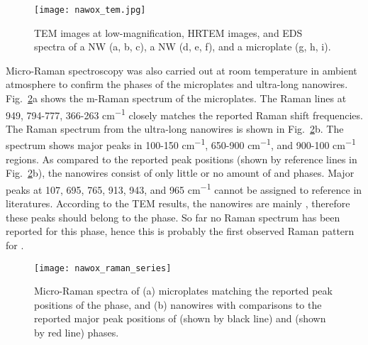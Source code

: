 \begin{figure}[htb]
\centering
\texttt{[image: nawox\_tem.jpg]}
\caption[SEM images of morphology evolution]{TEM images at low-magnification, HRTEM images, and EDS spectra of a  NW (a, b, c), a  NW (d, e, f), and a  microplate (g, h, i). }
\label{fig:nawoxtem}
\end{figure}

Micro-Raman spectroscopy was also carried out at room temperature in ambient atmosphere to confirm the phases of the microplates and ultra-long nanowires. Fig.~\ref{fig:nawoxram}a shows the m-Raman spectrum of the microplates. The Raman lines at 949, 794-777, 366-263 \si{cm^{-1}} closely matches the reported  Raman shift frequencies.\cite{Fomichev1992} The Raman spectrum from the ultra-long nanowires is shown in Fig.~\ref{fig:nawoxram}b. The spectrum shows major peaks in 100-150 \si{cm^{-1}}, 650-900 \si{cm^{-1}}, and 900-100 \si{cm^{-1}} regions. As compared to the reported peak positions (shown by reference lines in Fig.~\ref{fig:nawoxram}b), the nanowires consist of only little or no amount of  and  phases. Major peaks at 107, 695, 765, 913, 943, and 965 \si{cm^{-1}} cannot be assigned to reference in literatures. According to the TEM results, the nanowires are mainly , therefore these peaks should belong to the  phase. So far no Raman spectrum has been reported for this phase, hence this is probably the first observed Raman pattern for .

\begin{figure}[htb]
\centering
\texttt{[image: nawox\_raman\_series]}
\caption[Raman spectra on ]{Micro-Raman spectra of (a) microplates matching the reported peak positions of the  phase, and (b) nanowires with comparisons to the reported major peak positions of  (shown by black line) and  (shown by red line) phases.}
\label{fig:nawoxram}
\end{figure}

